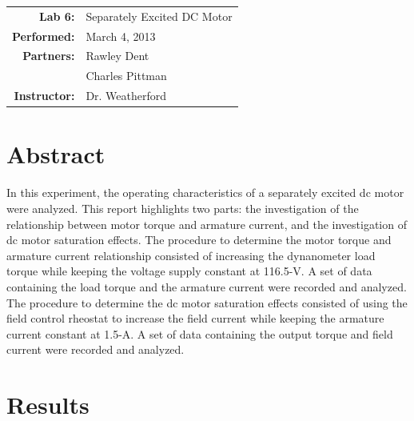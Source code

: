 \documentclass{article}
\begin{document}
\begin{tabular}{rl}
  \textbf{Lab 6:} & Separately Excited DC Motor \\
  \textbf{Performed:} & March 4, 2013 \\
  \textbf{Partners:} & Rawley Dent \\ & Charles Pittman \\
  \textbf{Instructor:} & Dr. Weatherford
\end{tabular}


\section*{Abstract}

In this experiment, the operating characteristics of a separately excited dc motor were analyzed. 
This report highlights two parts: the investigation of the relationship between motor torque and 
armature current, and the investigation of dc motor saturation effects. The procedure to determine
the motor torque and armature current relationship consisted of increasing the dynanometer load torque
while keeping the voltage supply constant at 116.5-V. A set of data containing the load torque and 
the armature current were recorded and analyzed. The procedure to determine the dc motor saturation 
effects consisted of using the field control rheostat to increase the field current while keeping the 
armature current constant at 1.5-A. A set of data containing the output torque and field current were 
recorded and analyzed.

\section*{Results}
\end{document}
